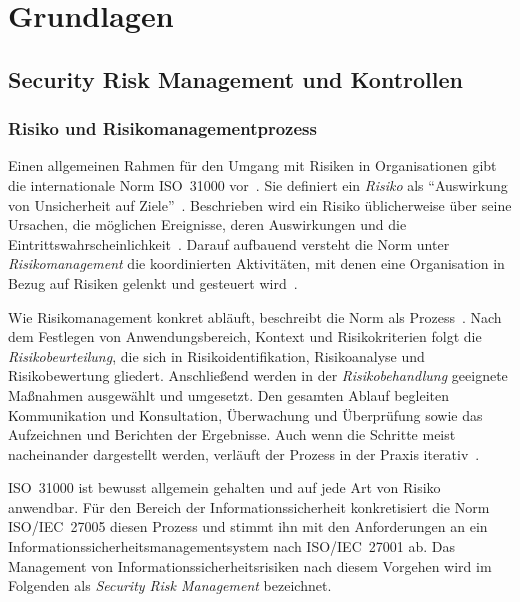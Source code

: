 \chapter{Grundlagen}\label{cha:grundlagen}

\section{Security Risk Management und Kontrollen}\label{sec:grundlagen-risk}
\subsection{Risiko und Risikomanagementprozess}
Einen allgemeinen Rahmen für den Umgang mit Risiken in Organisationen gibt die internationale Norm ISO~31000 vor~\cite{iso31000}.
Sie definiert ein \emph{Risiko} als \enquote{Auswirkung von Unsicherheit auf Ziele}~\cite[S.~7]{iso31000}.
Beschrieben wird ein Risiko üblicherweise über seine Ursachen, die möglichen Ereignisse, deren Auswirkungen und die Eintrittswahrscheinlichkeit~\cite[S.~7]{iso31000}.
Darauf aufbauend versteht die Norm unter \emph{Risikomanagement} die koordinierten Aktivitäten, mit denen eine Organisation in Bezug auf Risiken gelenkt und gesteuert wird~\cite[S.~7]{iso31000}.

Wie Risikomanagement konkret abläuft, beschreibt die Norm als Prozess~\cite[S.~16--23]{iso31000}.
Nach dem Festlegen von Anwendungsbereich, Kontext und Risikokriterien folgt die \emph{Risikobeurteilung}, die sich in Risikoidentifikation, Risikoanalyse und Risikobewertung gliedert.
Anschließend werden in der \emph{Risikobehandlung} geeignete Maßnahmen ausgewählt und umgesetzt.
Den gesamten Ablauf begleiten Kommunikation und Konsultation, Überwachung und Überprüfung sowie das Aufzeichnen und Berichten der Ergebnisse.
Auch wenn die Schritte meist nacheinander dargestellt werden, verläuft der Prozess in der Praxis iterativ~\cite[S.~17]{iso31000}.

ISO~31000 ist bewusst allgemein gehalten und auf jede Art von Risiko anwendbar.
Für den Bereich der Informationssicherheit konkretisiert die Norm ISO/IEC~27005 diesen Prozess und stimmt ihn mit den Anforderungen an ein Informationssicherheitsmanagementsystem nach ISO/IEC~27001 ab\cite[S.~7, 15]{iso27005}.
Das Management von Informationssicherheitsrisiken nach diesem Vorgehen wird im Folgenden als \emph{Security Risk Management} bezeichnet.

